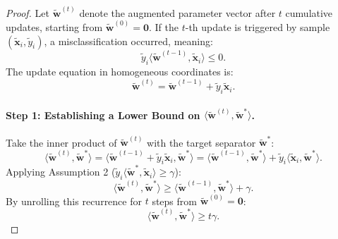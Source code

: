 \documentclass[11pt]{article}
\begin{document}
\begin{proof}
Let $\tilde{\mathbf{w}}^{(t)}$ denote the augmented parameter vector after $t$ cumulative updates, starting from $\tilde{\mathbf{w}}^{(0)} = \mathbf{0}$. If the $t$-th update is triggered by sample $(\tilde{\mathbf{x}}_i, \tilde{y}_i)$, a misclassification occurred, meaning:
\begin{equation}
\label{eq:misclass_condition}
\tilde{y}_i \langle \tilde{\mathbf{w}}^{(t-1)}, \tilde{\mathbf{x}}_i \rangle \le 0.
\end{equation}
The update equation in homogeneous coordinates is:
\begin{equation}
\tilde{\mathbf{w}}^{(t)} = \tilde{\mathbf{w}}^{(t-1)} + \tilde{y}_i \tilde{\mathbf{x}}_i.
\end{equation}

\paragraph{Step 1: Establishing a Lower Bound on $\langle \tilde{\mathbf{w}}^{(t)}, \tilde{\mathbf{w}}^* \rangle$.}
Take the inner product of $\tilde{\mathbf{w}}^{(t)}$ with the target separator $\tilde{\mathbf{w}}^*$:
\begin{equation}
\langle \tilde{\mathbf{w}}^{(t)}, \tilde{\mathbf{w}}^* \rangle = \langle \tilde{\mathbf{w}}^{(t-1)} + \tilde{y}_i \tilde{\mathbf{x}}_i, \tilde{\mathbf{w}}^* \rangle = \langle \tilde{\mathbf{w}}^{(t-1)}, \tilde{\mathbf{w}}^* \rangle + \tilde{y}_i \langle \tilde{\mathbf{x}}_i, \tilde{\mathbf{w}}^* \rangle.
\end{equation}
Applying Assumption 2 ($\tilde{y}_i \langle \tilde{\mathbf{w}}^*, \tilde{\mathbf{x}}_i \rangle \ge \gamma$):
\begin{equation}
\langle \tilde{\mathbf{w}}^{(t)}, \tilde{\mathbf{w}}^* \rangle \ge \langle \tilde{\mathbf{w}}^{(t-1)}, \tilde{\mathbf{w}}^* \rangle + \gamma.
\end{equation}
By unrolling this recurrence for $t$ steps from $\tilde{\mathbf{w}}^{(0)} = \mathbf{0}$:
\begin{equation}
\label{eq:proof_lower_bound}
\langle \tilde{\mathbf{w}}^{(t)}, \tilde{\mathbf{w}}^* \rangle \ge t \gamma.
\end{equation}


\end{proof}
\end{document}

